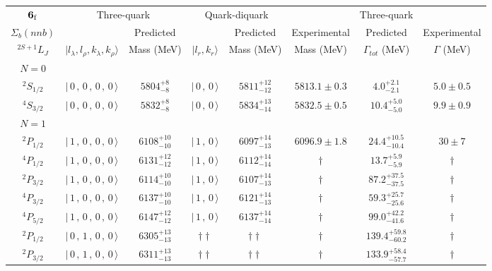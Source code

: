 \begin{tabular}{c| c c c c c c c}\hline \hline
${\bf {6}}_{\rm f}$ & \multicolumn{2}{c}{Three-quark} &  \multicolumn{2}{c}{Quark-diquark}   &    &  Three-quark  &\\ 
$\Sigma_{b}(nnb)$ &   & Predicted  &   &  Predicted   &  Experimental &  Predicted            & Experimental \\ 
 $^{2S+1}L_{J}$ & $\vert l_{\lambda}, l_{\rho}, k_{\lambda}, k_{\rho} \rangle$ & Mass (MeV)  & $\vert l_{r}, k_{r} \rangle$  &  Mass (MeV)   &  Mass (MeV)   &  $\Gamma_{tot}$ (MeV) & $\Gamma$ (MeV) \\ \hline
\hline
 $N=0$  &  &  &  &  &  \\ 
$^{2}S_{1/2}$ & $\vert \,0\,,\,0\,,\,0\,,\,0 \,\rangle $ & $5804^{+8}_{-8}$ & $\vert \,0\,,\,0 \,\rangle$ & $5811^{+12}_{-12}$ & $5813.1\pm 0.3$ & $4.0^{+2.1}_{-2.1}$ & $5.0\pm 0.5$ \\ 
$^{4}S_{3/2}$ & $\vert \,0\,,\,0\,,\,0\,,\,0 \,\rangle $ & $5832^{+8}_{-8}$ & $\vert \,0\,,\,0 \,\rangle$ & $5834^{+13}_{-14}$ & $5832.5\pm 0.5$ & $10.4^{+5.0}_{-5.0}$ & $9.9\pm 0.9$ \\ 
\hline
 $N=1$  &  &  &  &  &  \\ 
$^{2}P_{1/2}$ & $\vert \,1\,,\,0\,,\,0\,,\,0 \,\rangle $ & $6108^{+10}_{-10}$ & $\vert \,1\,,\,0 \,\rangle$ & $6097^{+14}_{-13}$ & $6096.9\pm 1.8$ & $24.4^{+10.5}_{-10.4}$ & $30\pm 7$ \\ 
$^{4}P_{1/2}$ & $\vert \,1\,,\,0\,,\,0\,,\,0 \,\rangle $ & $6131^{+12}_{-12}$ & $\vert \,1\,,\,0 \,\rangle$ & $6112^{+14}_{-14}$ & $\dagger$ & $13.7^{+5.9}_{-5.9}$ & $\dagger$ \\ 
$^{2}P_{3/2}$ & $\vert \,1\,,\,0\,,\,0\,,\,0 \,\rangle $ & $6114^{+10}_{-10}$ & $\vert \,1\,,\,0 \,\rangle$ & $6107^{+14}_{-13}$ & $\dagger$ & $87.2^{+37.5}_{-37.5}$ & $\dagger$ \\ 
$^{4}P_{3/2}$ & $\vert \,1\,,\,0\,,\,0\,,\,0 \,\rangle $ & $6137^{+10}_{-10}$ & $\vert \,1\,,\,0 \,\rangle$ & $6121^{+14}_{-13}$ & $\dagger$ & $59.3^{+25.7}_{-25.6}$ & $\dagger$ \\ 
$^{4}P_{5/2}$ & $\vert \,1\,,\,0\,,\,0\,,\,0 \,\rangle $ & $6147^{+12}_{-12}$ & $\vert \,1\,,\,0 \,\rangle$ & $6137^{+14}_{-14}$ & $\dagger$ & $99.0^{+42.2}_{-41.6}$ & $\dagger$ \\ 
$^{2}P_{1/2}$ & $\vert \,0\,,\,1\,,\,0\,,\,0 \,\rangle $ & $6305^{+13}_{-13}$ & $\dagger\dagger$ & $\dagger\dagger$ & $\dagger$ & $139.4^{+59.8}_{-60.2}$ & $\dagger$ \\ 
$^{2}P_{3/2}$ & $\vert \,0\,,\,1\,,\,0\,,\,0 \,\rangle $ & $6311^{+13}_{-13}$ & $\dagger\dagger$ & $\dagger\dagger$ & $\dagger$ & $133.9^{+58.4}_{-57.7}$ & $\dagger$ \\ 

\end{tabular}
